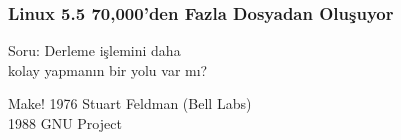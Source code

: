 \documentclass{beamer}
\begin{document}
{
\begin{frame}
    \frametitle{Linux 5.5 70,000'den Fazla Dosyadan Oluşuyor}
    Soru: Derleme işlemini daha\\ kolay yapmanın bir yolu var mı?
    
\end{frame}
}

{
\begin{frame}
    {Make!}
    1976 Stuart Feldman (Bell Labs)\\
    1988 GNU Project
\end{frame}
}
\end{document}
